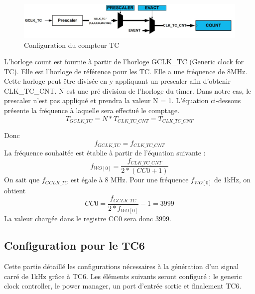 \documentclass[a4paper]{article}
\begin{document}
	\begin{figure}[H]
		\centering
		\includegraphics[width=12cm]{prescaler.jpg}
		\caption{Configuration du compteur TC}
	\end{figure}
	
	L'horloge count est fournie à partir de l’horloge GCLK\_TC (Generic clock for TC). Elle est l'horloge de référence pour les TC. Elle a une fréquence de 8MHz. Cette horloge peut être divisée en y appliquant un prescaler afin d’obtenir CLK\_TC\_CNT. N est une pré division de l’horloge du timer. Dans notre cas, le prescaler n’est pas appliqué et prendra la valeur N = 1. L'équation ci-dessous présente la fréquence à laquelle sera effectué le comptage. \\
	\begin{equation}
		T_{GCLK\_TC} = N*T_{CLK\_TC\_CNT} = T_{CLK\_TC\_CNT}
	\end{equation}
	
	Donc
	\begin{equation}
		f_{GCLK\_TC} = f_{CLK\_TC\_CNT}
	\end{equation}
	La fréquence souhaitée est établie à partir de l'équation suivante :
	\begin{equation}
		f_{WO[0]} = \frac{f_{CLK\_TC\_CNT}}{2*(CC0+1)}
	\end{equation}
	On sait que $f_{GCLK\_TC}$ est égale à 8 MHz. Pour une fréquence $f_{WO[0]}$ de 1kHz, on obtient\\
	\begin{equation}
		CC0 = \frac{f_{GCLK\_TC}}{2*f_{WO[0]}} - 1 = 3999
	\end{equation}
	La valeur chargée dans le registre CC0 sera donc 3999.
	
	\subsection{Configuration pour le TC6}
	Cette partie détaillé les configurations nécessaires à la génération d'un signal carré de 1kHz grâce à TC6. Les éléments suivants seront configuré : le generic clock controller, le power manager, un port d'entrée sortie et finalement TC6.
\end{document}
